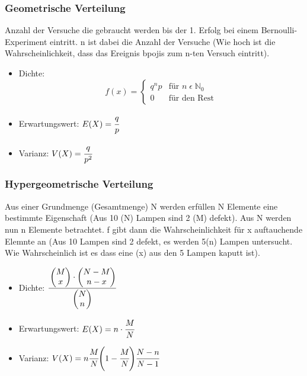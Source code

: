 \documentclass[a4paper]{scrartcl}
\begin{document}
            \subsubsection{Geometrische Verteilung}
            Anzahl der Versuche die gebraucht werden bis der 1. Erfolg bei einem Bernoulli-Experiment eintritt. n ist dabei die Anzahl der Versuche (Wie hoch ist die 
            Wahrscheinlichkeit, dass das Ereignis bpojis zum n-ten Versuch eintritt).
            \begin{itemize}
                \item Dichte: \[f(x)=
                                                    \begin{cases}
                                                        q^np     & \text{für } n \; \epsilon \; \mathbb{N}_0 \\
                                                        0     & \text{für den Rest} 
                                                    \end{cases}
                                                    \] 
                \item Erwartungswert: \(E(X) = \cfrac{q}{p}\)
                \item Varianz: \(V(X) = \cfrac{q}{p^2}\) 
            \end{itemize}
            \subsubsection{Hypergeometrische Verteilung}
                Aus einer Grundmenge (Gesamtmenge) N werden erfüllen N Elemente eine bestimmte Eigenschaft (Aus 10 (N) Lampen sind 2 (M) defekt).
                Aus N werden nun n Elemente betrachtet. f gibt dann die Wahrscheinlichkeit für x auftauchende Elemnte an (Aus 10 Lampen sind 2 defekt,
                es werden 5(n) Lampen untersucht. Wie Wahrscheinlich ist es dass eine (x) aus den 5 Lampen kaputt ist).
                \begin{itemize}
                    \item Dichte: \(\cfrac{\begin{pmatrix} M \\ x \end{pmatrix} \cdot \begin{pmatrix} N - M \\ n - x \end{pmatrix}}{\begin{pmatrix} N \\ n \end{pmatrix}}\)
                    \item Erwartungswert: \(E(X) = n \cdot \cfrac{M}{N}\)
                    \item Varianz: \(V(X) = n \cfrac{M}{N} \Bigg(1 - \cfrac{M}{N} \Bigg) \cfrac{N - n}{N - 1} \)
                \end{itemize}
\end{document}
